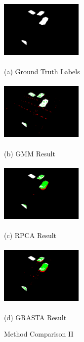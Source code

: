 \documentclass{article}
\begin{document}
\begin{figure}[t]

\begin{minipage}[b]{0.48\linewidth}
  \centering
  \centerline{\includegraphics[width=4cm, height=3cm]{Imgs/0412041242.png}}
  \centerline{(a) Ground Truth Labels}\medskip
\end{minipage}
\begin{minipage}[b]{0.48\linewidth}
  \centering
  \centerline{\includegraphics[width=4cm, height=3cm]{Imgs/0412041242_gmm_rwg.png}}
  \centerline{(b) GMM Result}\medskip
\end{minipage}

\begin{minipage}[b]{0.48\linewidth}
  \centering
  \centerline{\includegraphics[width=4cm, height =3cm]{Imgs/0412041242_rpca_rwg.png}}
  \centerline{(c) RPCA Result}\medskip
\end{minipage}
\begin{minipage}[b]{0.48\linewidth}
  \centering
  \centerline{\includegraphics[width=4cm, height = 3cm]{Imgs/0412041242_grasta_rwg.png}}
  \centerline{(d) GRASTA Result}\medskip
\end{minipage}

\caption{Method Comparison II}
\label{fig:methodComp2}
%
\end{figure}
\end{document}
